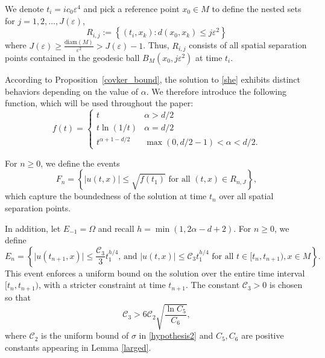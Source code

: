 \documentclass[12pt]{amsart}
\numberwithin{equation}{section}
\newcommand{\1}{\mathbf{1}}
\begin{document}
We denote $t_i=ic_0\varepsilon^4$ and pick a reference point $x_0\in M$ to define the nested sets for $j=1,2,\dots,J(\varepsilon)$,
\begin{equation}
\label{Rij}
R_{i,j}:=\left\lbrace(t_i,x_k):d(x_0,x_k)\leq j\varepsilon^2
    \right\rbrace
\end{equation}
where $J(\varepsilon)\geq\frac{\text{diam}(M)}{\varepsilon^2}>J(\varepsilon)-1$. Thus, $R_{i,j}$ consists of all spatial separation points contained in the geodesic ball $B_M(x_0,j\varepsilon^2)$ at time $t_i$. 

According to Proposition~\ref{covker_bound}, the solution to \eqref{she} exhibits distinct behaviors depending on the value of $\alpha$. We therefore introduce the following function, which will be used throughout the paper:
\begin{equation}
\label{f_t}
        f(t) = \begin{cases}
            t & \alpha>d/2\\
            t\ln(1/t) & \alpha=d/2\\
            t^{\alpha+1-d/2} & \max(0,d/2-1)<\alpha<d/2.
        \end{cases}
    \end{equation}

For $n\geq0$, we define the events
\begin{equation}
\label{Fn}
F_n=\left\lbrace\vert u(t,x)\vert\leq \sqrt{f(t_1)}\text{ for all } (t,x)\in R_{n,J}\right\rbrace,
\end{equation}
which capture the boundedness of the solution at time $t_n$ over all spatial separation points.

In addition, let $E_{-1}=\Omega$ and recall $h=\min(1,2\alpha-d+2)$. For $n\geq0$, we define
\begin{equation}
\label{En}
E_n=\left\lbrace\vert u(t_{n+1},x)\vert\leq \frac{\mathcal{C}_3}{3}t_1^{h/4},\,\text{and }\vert u(t,x)\vert\leq \mathcal{C}_3t_1^{h/4}\text{ for all } t\in[t_n,t_{n+1}),x\in M\right\rbrace.
\end{equation}
This event enforces a uniform bound on the solution over the entire time interval $[t_n,t_{n+1})$, with a stricter constraint at time $t_{n+1}$. The constant $\mathcal{C}_3>0$ is chosen so that
\begin{equation}
\label{c3}
\mathcal{C}_3>6\mathcal{C}_2\sqrt{\frac{\ln C_5}{C_6}},
\end{equation}
where $\mathcal{C}_2$ is the uniform bound of $\sigma$ in \eqref{hypothesis2} and $C_5,C_6$ are positive constants appearing in Lemma \ref{larged}.
\end{document}
